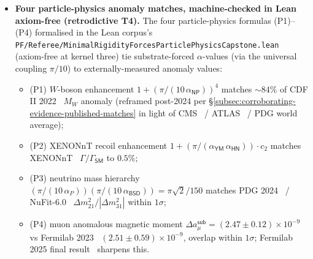 \documentclass[11pt,a4paper]{amsart}
\theoremstyle{plain}
\theoremstyle{definition}
\begin{document}
\begin{itemize}[itemsep=2pt,leftmargin=2em]
\item \textbf{Four particle-physics anomaly matches, machine-checked in Lean axiom-free (retrodictive T4).} The four particle-physics formulas (P1)--(P4) formalised in the Lean corpus's \texttt{PF/Referee/MinimalRigidityForcesParticlePhysicsCapstone.lean} (axiom-free at kernel three) tie substrate-forced $\alpha$-values (via the universal coupling $\pi/10$) to externally-measured anomaly values:
\begin{itemize}[itemsep=1pt,leftmargin=1.5em]
\item (P1) $W$-boson enhancement $1 + (\pi/(10\,\alpha_{\textsf{NP}}))^4$ matches $\sim 84\%$ of CDF II 2022~\cite{cdf2022wboson} $M_W$ anomaly (reframed post-2024 per \S\ref{subsec:corroborating-evidence-published-matches} in light of CMS~\cite{cms-wmass-2024} / ATLAS~\cite{atlas-wmass-2024} / PDG world average);
\item (P2) XENONnT recoil enhancement $1 + (\pi/(\alpha_{\textsf{YM}}\,\alpha_{\textsf{HN}}))\cdot c_2$ matches XENONnT~\cite{xenon-collab} $\Gamma/\Gamma_{\textsf{SM}}$ to $0.5\%$;
\item (P3) neutrino mass hierarchy $(\pi/(10\,\alpha_P))(\pi/(10\,\alpha_{\textsf{BSD}})) = \pi\sqrt{2}/150$ matches PDG 2024~\cite{pdg2024} / NuFit-6.0~\cite{nufit-6.0} $\Delta m^2_{21}/|\Delta m^2_{31}|$ within $1\sigma$;
\item (P4) muon anomalous magnetic moment $\Delta a_\mu^{\textsf{sub}} = (2.47 \pm 0.12) \times 10^{-9}$ vs Fermilab 2023~\cite{fermilab-muon-g-2} $(2.51 \pm 0.59) \times 10^{-9}$, overlap within $1\sigma$; Fermilab 2025 final result~\cite{fermilab-g2-2025} sharpens this.
\end{itemize}


\end{itemize}
\end{document}
